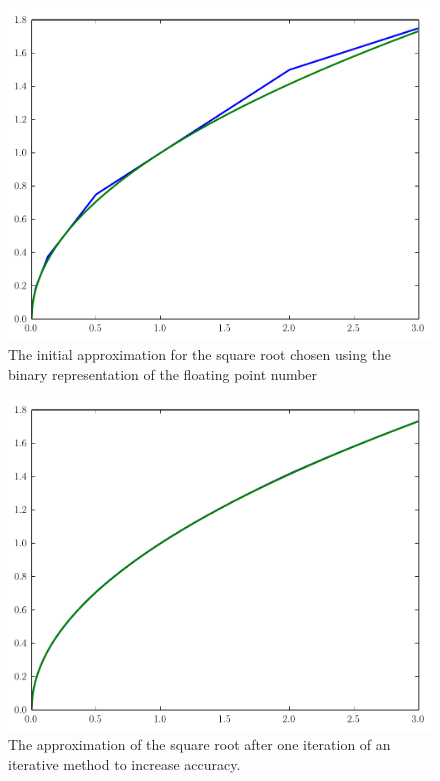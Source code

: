 \begin{figure}
\includegraphics[width=\textwidth]{sqrt0}
\caption{The initial approximation for the square root chosen using the binary representation of the floating point number}
\label{float:sqrtapprox0}
\end{figure}

\begin{figure}
\includegraphics[width=\textwidth]{sqrt1}
\caption{The approximation of the square root after one iteration of an iterative method to increase accuracy.}
\label{float:sqrtapprox1}
\end{figure}

